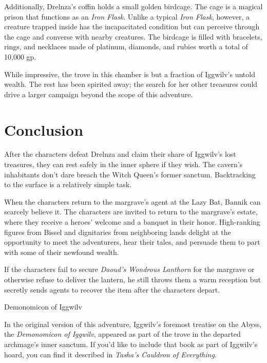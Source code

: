 \documentclass[10pt,a4paper,twoside,bg=print,twocolumn,openany,nodeprecatedcode]{dndbook}
\begin{document}
Additionally, Drelnza's coffin holds a small golden birdcage. The cage is a magical prison that functions as an \textit{Iron Flask}. Unlike a typical \textit{Iron Flask}, however, a creature trapped inside has the incapacitated condition but can perceive through the cage and converse with nearby creatures. The birdcage is filled with bracelets, rings, and necklaces made of platinum, diamonds, and rubies worth a total of 10,000 gp.

While impressive, the trove in this chamber is but a fraction of Iggwilv's untold wealth. The rest has been spirited away; the search for her other treasures could drive a larger campaign beyond the scope of this adventure.

\section{Conclusion}
After the characters defeat Drelnza and claim their share of Iggwilv's lost treasures, they can rest safely in the inner sphere if they wish. The cavern's inhabitants don't dare breach the Witch Queen's former sanctum. Backtracking to the surface is a relatively simple task.

When the characters return to the margrave's agent at the Lazy Bat, Bannik can scarcely believe it. The characters are invited to return to the margrave's estate, where they receive a heroes' welcome and a banquet in their honor. High-ranking figures from Bissel and dignitaries from neighboring lands delight at the opportunity to meet the adventurers, hear their tales, and persuade them to part with some of their newfound wealth.

If the characters fail to secure \textit{Daoud's Wondrous Lanthorn} for the margrave or otherwise refuse to deliver the lantern, he still throws them a warm reception but secretly sends agents to recover the item after the characters depart.

\begin{DndSidebar}[float=!b]{}
Demonomicon of Iggwilv



In the original version of this adventure, Iggwilv's foremost treatise on the Abyss, the \textit{Demonomicon of Iggwilv}, appeared as part of the trove in the departed archmage's inner sanctum. If you'd like to include that book as part of Iggwilv's hoard, you can find it described in \textit{Tasha's Cauldron of Everything}.



\end{DndSidebar}
\end{document}
